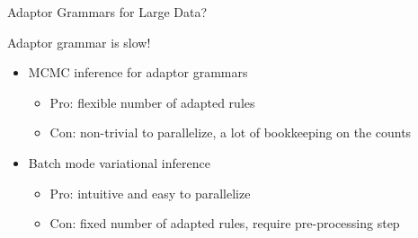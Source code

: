 \begin{frame}{Adaptor Grammars for Large Data?}
  \vspace{-1mm}
  \begin{block}{Adaptor grammar is slow!}
    \begin{itemize}
    \item MCMC inference for adaptor grammars~\cite{johnson-06}
      \begin{itemize}
      \item Pro: flexible number of adapted rules
      \item Con: non-trivial to parallelize, a lot of bookkeeping on
        the counts
      \end{itemize}
    \item Batch mode variational inference~\cite{cohen-10}
      \begin{itemize}
      \item Pro: intuitive and easy to parallelize
      \item Con: fixed number of adapted rules, require pre-processing step
      \end{itemize}
    \end{itemize}
  \end{block}


\end{frame}

